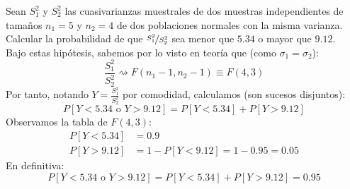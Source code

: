 \begin{ejercicio}
    Sean $S_1^2$ y $S_2^2$ las cuasivarianzas muestrales de dos muestras independientes de tamaños $n_1 = 5$ y $n_2 = 4$ de dos poblaciones normales con la misma varianza. Calcular la probabilidad de que $\nicefrac{S_1^2}{S_2^2}$ sea menor que $5.34$ o mayor que $9.12$.\\

    \noindent
    Bajo estas hipótesis, sabemos por lo visto en teoría que (como $\sigma_1=\sigma_2$):
    \begin{equation*}
        \dfrac{S_1^2}{S_2^2} \rightsquigarrow F(n_1-1, n_2-1) \equiv F(4,3)
    \end{equation*}
    Por tanto, notando $Y = \frac{S_1^2}{S_2^2}$ por comodidad, calculamos (son sucesos disjuntos):
    \begin{equation*}
        P[Y < 5.34 \text{\ o\ } Y>9.12] = P[Y<5.34] + P[Y>9.12]
    \end{equation*}
    Observamos la tabla de $F(4,3)$:
    \begin{align*}
        P[Y<5.34] &= 0.9 \\
        P[Y>9.12] &= 1-P[Y<9.12] = 1-0.95 = 0.05
    \end{align*}
    En definitiva:
    \begin{equation*}
        P[Y < 5.34 \text{\ o\ } Y>9.12] = P[Y<5.34] + P[Y>9.12] = 0.95
    \end{equation*}
\end{ejercicio}

